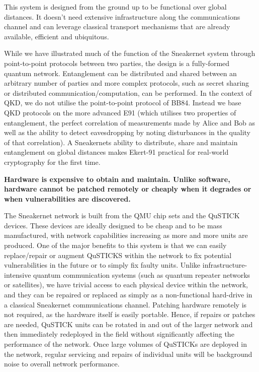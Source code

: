 \documentclass[twocolumn, aps, rmp, amsmath, amssymb, nofootinbib, superscriptaddress, longbibliography, floatfix, table-of-contents, eqsecnum]{revtex4-2}
\begin{document}
This system is designed from the ground up to be functional over global distances. It doesn't need extensive infrastructure along the communications channel and can leverage classical transport mechanisms that are already available, efficient and ubiquitous. 

While we have illustrated much of the function of the Sneakernet system through point-to-point protocols between two parties, the design is a fully-formed quantum network. Entanglement can be distributed and shared between an arbitrary number of parties and more complex protocols, such as secret sharing or distributed communication/computation, can be performed. In the context of QKD, we do not utilise the point-to-point protocol of BB84. Instead we base QKD protocols on the more advanced E91 (which utilises two properties of entanglement, the perfect correlation of measurements made by Alice and Bob as well as the ability to detect eavesdropping by noting disturbances in the quality of that correlation). A Sneakernets ability to distribute, share and maintain entanglement on global distances makes Ekert-91 practical for real-world cryptography for the first time.

\textbf{Hardware is expensive to obtain and maintain. Unlike software, hardware cannot be patched remotely or cheaply when it degrades or when vulnerabilities are discovered.}

The Sneakernet network is built from the QMU chip sets and the QuSTICK devices. These devices are ideally designed to be cheap and to be mass manufactured, with network capabilities increasing as more and more units are produced. One of the major benefits to this system is that we can easily replace/repair or augment QuSTICKS within the network to fix potential vulnerabilities in the future or to simply fix faulty units. Unlike infrastructure-intensive quantum communication systems (such as quantum repeater networks or satellites), we have trivial access to each physical device within the network, and they can be repaired or replaced as simply as a non-functional hard-drive in a classical Sneakernet communications channel. Patching hardware remotely is not required, as the hardware itself is easily portable. Hence, if repairs or patches are needed, QuSTICK units can be rotated in and out of the larger network and then immediately redeployed in the field without significantly affecting the performance of the network. Once large volumes of QuSTICKs are deployed in the network, regular servicing and repairs of individual units will be background noise to overall network performance. 
\end{document}
